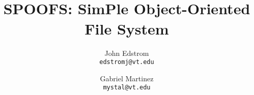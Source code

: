\documentclass[10pt,onecolumn,letterpaper]{article}
\begin{document}
\title{\LARGE~\\[-8.0ex] SPOOFS: SimPle Object-Oriented File System}
\author{John Edstrom\\
    \texttt{edstromj@vt.edu} \and
    Gabriel Martinez\\
    \texttt{mystal@vt.edu}}


\date{}
\maketitle












\end{document}
